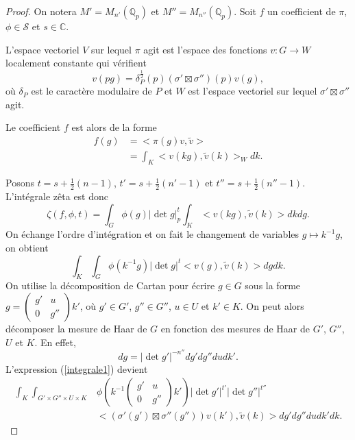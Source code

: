 \begin{proof}
On notera $M'=M_{n'}(\mathbb{Q}_p)$ et $M''=M_{n''}(\mathbb{Q}_p)$. Soit $f$ un coefficient de $\pi$, $\phi \in \mathcal{S}$ et $s \in \mathbb{C}$.

L'espace vectoriel $V$ sur lequel $\pi$ agit est l'espace des fonctions $v : G \rightarrow W$ localement constante qui vérifient
\begin{equation}
v(pg)=\delta_P^{\frac{1}{2}}(p)(\sigma' \boxtimes \sigma'')(p)v(g),
\end{equation}
où $\delta_P$ est le caractère modulaire de $P$ et $W$ est l'espace vectoriel sur lequel $\sigma' \boxtimes \sigma''$ agit.

Le coefficient $f$ est alors de la forme
\begin{align}
f(g)&=<\pi(g)v,\tilde{v}> \\
&= \int_K <v(kg),\tilde{v}(k)>_W dk.
\end{align}

Posons $t=s+\frac{1}{2}(n-1)$, $t'=s+\frac{1}{2}(n'-1)$ et $t''=s+\frac{1}{2}(n''-1)$. L'intégrale zêta est donc
\begin{equation}
\zeta(f,\phi,t)=\int_G \phi(g)|\det g|_p^t \int_K <v(kg),\tilde{v}(k)>dk dg.
\end{equation}
On échange l'ordre d'intégration et on fait le changement de variables $g \mapsto k^{-1}g$, on obtient
\begin{equation}
\label{integrale1}
\int_K \int_G \phi(k^{-1}g)|\det g|^t<v(g),\tilde{v}(k)>dg dk.
\end{equation}
On utilise la décomposition de Cartan pour écrire $g \in G$ sous la forme $g = \begin{pmatrix} 
g' & u \\
0 & g'' 
\end{pmatrix} k'$, où $g' \in G'$, $g'' \in G''$, $u \in U$ et $k' \in K$. On peut alors décomposer la mesure de Haar de $G$ en fonction des mesures de Haar de $G'$, $G''$, $U$ et $K$. En effet,
\begin{equation}
dg = |\det g'|^{-n''}dg'dg''dudk'.
\end{equation}
L'expression (\ref{integrale1}) devient
\begin{equation}
\label{integrale2}
\begin{split}
\int_K \int_{G' \times G'' \times U \times K} &\phi(k^{-1}\begin{pmatrix} 
g' & u \\
0 & g'' 
\end{pmatrix} k') |\det g'|^{t'}|\det g''|^{t''} \\
&<(\sigma'(g') \boxtimes \sigma''(g''))v(k'), \tilde{v}(k)> dg' dg'' du dk' dk.
\end{split}
\end{equation}


\end{proof}
